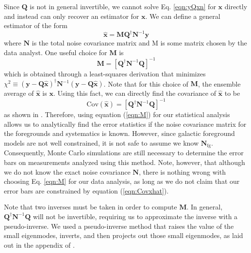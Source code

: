 \documentclass[twolcolumn,apj]{emulateapj}
\newcommand{\y}{\mathbf{y}}
\newcommand{\N}{\mathbf{N}}
\newcommand{\Q}{\mathbf{Q}}
\newcommand{\M}{\mathbf{M}}
\begin{document}
Since $\Q$ is not in general invertible, we cannot solve Eq. \eqref{eqn:yQxn} for $\mathbf{x}$ directly and instead can only recover an estimator for $\mathbf{x}$. We can define a general estimator of the form 
\begin{equation}
\mathbf{\hat x} = \M \Q^\dagger \N^{-1} \y
\label{eqn:xhat}
\end{equation}
where $\N$ is the total noise covariance matrix and M is some matrix chosen by the data analyst. One useful choice for $\M$ is 
\begin{equation}
\M = [\Q^\dagger \N^{-1} \Q]^{-1}
\label{eqn:M}
\end{equation}
which is obtained through a least-squares derivation that minimizes $\chi^2 \equiv (\y-\Q \mathbf{\hat x})^\dagger \N^{-1} (\y-\Q \mathbf{\hat x})$. Note that for this choice of $\M$, the ensemble average of $\mathbf{\hat x}$ is $\mathbf{x}$.
Using this fact, we can directly find the covariance of $\mathbf{\hat x}$ to be 
\begin{equation}
\textrm{Cov}(\mathbf{\hat x}) = [\Q^\dagger \N^{-1} \Q]^{-1}
\label{eqn:Covxhat}
\end{equation}
as shown in \citet{Tegmark_CMB_maps_wli}. Therefore, using equation (\ref{eqn:M}) for our statistical analysis allows us to analytically find the error statistics if the noise covariance matrix for the foregrounds and systematics is known. However, since galactic foreground models are not well constrained, it is not safe to assume we know $\N_{\textrm{fg}}$. Consequently, Monte Carlo simulations are still necessary to determine the error bars on measurements analyzed using this method. Note, however, that although we do not know the exact noise covariance $\N$, there is nothing wrong with choosing Eq. \eqref{eqn:M} for our data analysis, as long as we do not claim that our error bars are constrained by equation (\ref{eqn:Covxhat}). %

Note that two inverses must be taken in order to compute $\M$. In general, $\Q^\dagger \N^{-1} \Q$ will not be invertible, requiring us to approximate the inverse with a pseudo-inverse. We used a pseudo-inverse method that raises the value of the small eigenmodes, inverts, and then projects out those small eigenmodes, as laid out in the appendix of \citet{Tegmark_CMB_spectra_wli}. 
\end{document}
